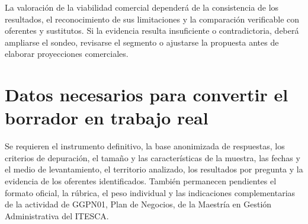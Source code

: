 \documentclass[12pt,letterpaper,oneside]{article}
\begin{document}
La valoración de la viabilidad comercial dependerá de la consistencia de los resultados, el reconocimiento de sus limitaciones y la comparación verificable con oferentes y sustitutos. Si la evidencia resulta insuficiente o contradictoria, deberá ampliarse el sondeo, revisarse el segmento o ajustarse la propuesta antes de elaborar proyecciones comerciales.

\section{Datos necesarios para convertir el borrador en trabajo real}

Se requieren el instrumento definitivo, la base anonimizada de respuestas, los criterios de depuración, el tamaño y las características de la muestra, las fechas y el medio de levantamiento, el territorio analizado, los resultados por pregunta y la evidencia de los oferentes identificados. También permanecen pendientes el formato oficial, la rúbrica, el peso individual y las indicaciones complementarias de la actividad de GGPN01, Plan de Negocios, de la Maestría en Gestión Administrativa del ITESCA.
\clearpage
\printbibliography[title={Fuentes de consulta}]
\end{document}
